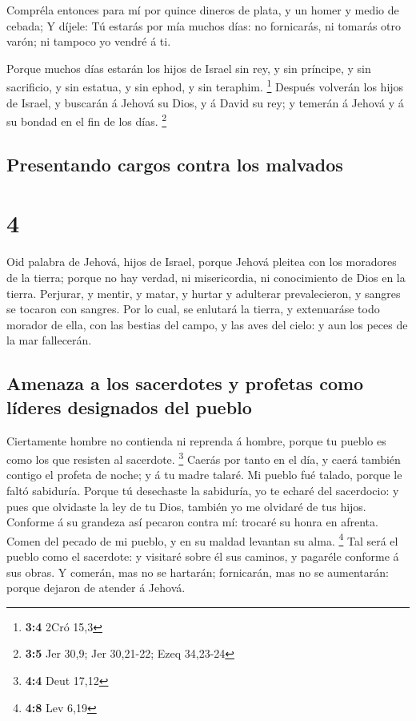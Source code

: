 Compréla entonces para mí por quince dineros de plata, y un
homer y medio de cebada;  Y díjele: Tú estarás por mía
muchos días: no fornicarás, ni tomarás otro varón; ni tampoco yo vendré
á ti.

 Porque muchos días estarán los hijos de Israel sin rey, y
sin príncipe, y sin sacrificio, y sin estatua, y sin ephod, y sin
teraphim. \footnote{\textbf{3:4} 2Cró 15,3}  Después
volverán los hijos de Israel, y buscarán á Jehová su Dios, y á David su
rey; y temerán á Jehová y á su bondad en el fin de los días. \footnote{\textbf{3:5}
  Jer 30,9; Jer 30,21-22; Ezeq 34,23-24}

\hypertarget{presentando-cargos-contra-los-malvados}{%
\subsection{Presentando cargos contra los
malvados}\label{presentando-cargos-contra-los-malvados}}

\hypertarget{section-3}{%
\section{4}\label{section-3}}

 Oid palabra de Jehová, hijos de Israel, porque Jehová
pleitea con los moradores de la tierra; porque no hay verdad, ni
misericordia, ni conocimiento de Dios en la tierra. 
Perjurar, y mentir, y matar, y hurtar y adulterar prevalecieron, y
sangres se tocaron con sangres.  Por lo cual, se enlutará la
tierra, y extenuaráse todo morador de ella, con las bestias del campo, y
las aves del cielo: y aun los peces de la mar fallecerán.

\hypertarget{amenaza-a-los-sacerdotes-y-profetas-como-luxedderes-designados-del-pueblo}{%
\subsection{Amenaza a los sacerdotes y profetas como líderes designados
del
pueblo}\label{amenaza-a-los-sacerdotes-y-profetas-como-luxedderes-designados-del-pueblo}}

 Ciertamente hombre no contienda ni reprenda á hombre,
porque tu pueblo es como los que resisten al sacerdote. \footnote{\textbf{4:4}
  Deut 17,12}  Caerás por tanto en el día, y caerá también
contigo el profeta de noche; y á tu madre talaré.  Mi pueblo
fué talado, porque le faltó sabiduría. Porque tú desechaste la
sabiduría, yo te echaré del sacerdocio: y pues que olvidaste la ley de
tu Dios, también yo me olvidaré de tus hijos.  Conforme á su
grandeza así pecaron contra mí: trocaré su honra en afrenta.
 Comen del pecado de mi pueblo, y en su maldad levantan su
alma. \footnote{\textbf{4:8} Lev 6,19}  Tal será el pueblo
como el sacerdote: y visitaré sobre él sus caminos, y pagaréle conforme
á sus obras.  Y comerán, mas no se hartarán; fornicarán,
mas no se aumentarán: porque dejaron de atender á Jehová.

